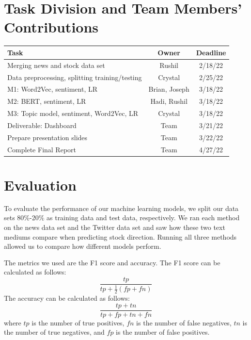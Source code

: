 \documentclass[conference]{IEEEtran}
\begin{document}
\section{Task Division and Team Members' Contributions}
\begin{table}[htp]
    \begin{center}
        \begin{tabular}{|l||c|c|} \hline\hline
            Task                                               & Owner         & Deadline  \\ \hline
            Merging news and stock data set                    & Rushil        & 2/18/22   \\
            Data preprocessing, splitting training/testing & Crystal       & 2/25/22   \\
            M1: Word2Vec, sentiment, LR                  & Brian, Joseph & 3/18/22   \\
            M2: BERT, sentiment, LR                & Hadi, Rushil  & 3/18/22   \\
            M3: Topic model, sentiment, Word2Vec, LR     & Crystal       & 3/18/22 \\
            Deliverable: Dashboard                             & Team          & 3/21/22 \\
            Prepare presentation slides                             & Team          & 3/22/22 \\
            Complete Final Report                             & Team          & 4/27/22 \\
            \hline\hline
        \end{tabular}
    \end{center}
\end{table}

\section{Evaluation}
To evaluate the performance of our machine learning models, we split our data sets 80\%-20\% as training data and test data, respectively. We  ran each method on the news data set and the Twitter data set and saw how these two text mediums compare when predicting stock direction. Running all three methods allowed us to compare how different models perform.

The metrics we used are the F1 score and accuracy. The F1 score can be calculated as follows:
\begin{equation*}
 \frac{tp}{tp+\frac{1}{2}(fp+fn)}
\end{equation*}
The accuracy can be calculated as follows:
\begin{equation*}
 \frac{tp + tn}{tp + fp + tn + fn}
\end{equation*}
where $tp$ is the number of true positives, $fn$ is the number of false negatives, $tn$ is the number of true negatives, and $fp$ is the number of false positives. 
\end{document}

